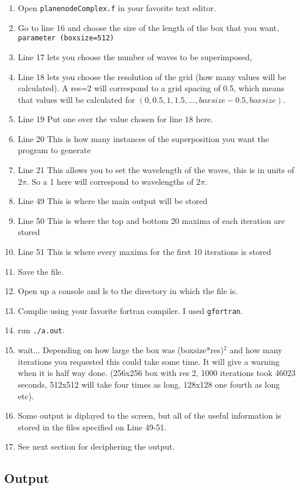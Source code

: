 \documentclass[12pt]{article}
\begin{document}
\begin{enumerate}
	\item Open \verb|planenodeComplex.f| in your favorite text editor.
	\item Go to line 16 and choose the size of the length of the box that you want, \verb|parameter (boxsize=512)|
	\item Line 17 lets you choose the number of waves to be superimposed,
	\item Line 18 lets you choose the resolution of the grid (how many values will be calculated). A res=2 will correspond to a grid spacing of 0.5, which means that values will be calculated for $(0, 0.5, 1, 1.5, \ldots , boxsize - 0.5, boxsize)$.
	\item Line 19 Put one over the value chosen for line 18 here.
	\item Line 20 This is how many instances of the superposition you want the program to generate
	\item Line 21 This allows you to set the wavelength of the waves, this is in units of $2 \pi$. So a 1 here will correspond to wavelengths of $2 \pi$.
	\item Line 49 This is where the main output will be stored
	\item Line 50 This is where the top and bottom 20 maxima of each iteration are stored
	\item Line 51 This is where every maxima for the first 10 iterations is stored
	\item Save the file.
	\item Open up a console and ls to the directory in which the file is.
	\item Complie using your favorite fortran compiler. I used \verb|gfortran|.
	\item run \verb|./a.out|.
	\item wait... Depending on how large the box was (boxsize*res)$^{2}$ and how many iterations you requested this could take some time. It will give a warning when it is half way done. (256x256 box with res 2, 1000 iterations took 46023 seconds, 512x512 will take four times as long, 128x128 one fourth as long etc).
	\item Some output is diplayed to the screen, but all of the useful information is stored in the files specified on Line 49-51.
	\item See next section for deciphering the output.
\end{enumerate}

\subsection{Output}
\end{document}
